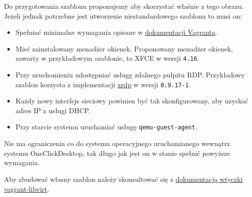 \documentclass[../opis-rozwiazania.tex]{subfiles}
\begin{document}
Do przygotowania szablonu proponujemy aby skorzystać właśnie z tego obrazu.
Jeżeli jednak potrzebne jest utworzenie niestandardowego szablonu to musi on:
\begin{itemize}
	\item Spełniać minimalne wymagania opisane w \href{https://www.vagrantup.com/docs/boxes/base}{dokumentacji Vagranta}.
	\item Mieć zainstalowany menadżer okienek. Proponowany menadżer okienek, zawarty w przykładowym szablonie, to XFCE w wersji \texttt{4.16}.
	\item Przy uruchomieniu udostępniać usługę zdalnego pulpitu RDP. Przykładowy szablon korzysta z implementacji \href{http://xrdp.org/}{xrdp} w wersji \texttt{0.9.17-1}.
	\item Każdy nowy interfejs sieciowy powinien być tak skonfigurowany, aby uzyskać adres IP z usługi DHCP.
	\item Przy starcie systemu uruchamiać usługę \texttt{qemu-guest-agent}.
\end{itemize}
Nie ma ograniczenia co do systemu operacyjnego uruchamianego wewnątrz systemu OneClickDesktop, tak długo jak jest on w stanie spełnić powyższe wymagania.

Aby zbudować własny szablon należy skonsultować się z \href{https://github.com/vagrant-libvirt/vagrant-libvirt#create-box}{dokumentacją wtyczki vagrant-libvirt}.
\end{document}
